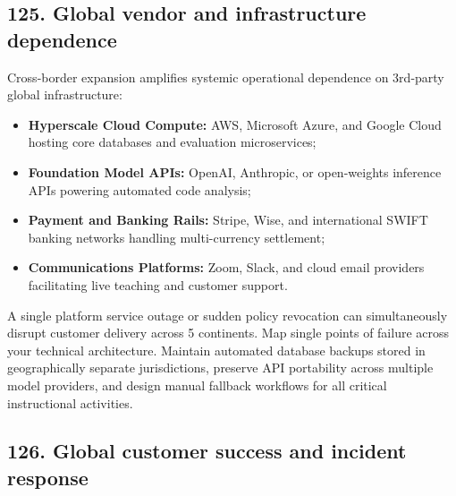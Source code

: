 \subsection{125. Global vendor and infrastructure dependence}

Cross-border expansion amplifies systemic operational dependence on 3rd-party global infrastructure:
\begin{itemize}
    \item \textbf{Hyperscale Cloud Compute:} AWS, Microsoft Azure, and Google Cloud hosting core databases and evaluation microservices;
    \item \textbf{Foundation Model APIs:} OpenAI, Anthropic, or open-weights inference APIs powering automated code analysis;
    \item \textbf{Payment and Banking Rails:} Stripe, Wise, and international SWIFT banking networks handling multi-currency settlement;
    \item \textbf{Communications Platforms:} Zoom, Slack, and cloud email providers facilitating live teaching and customer support.
\end{itemize}

A single platform service outage or sudden policy revocation can simultaneously disrupt customer delivery across 5 continents. Map single points of failure across your technical architecture. Maintain automated database backups stored in geographically separate jurisdictions, preserve API portability across multiple model providers, and design manual fallback workflows for all critical instructional activities.

\subsection{126. Global customer success and incident response}

